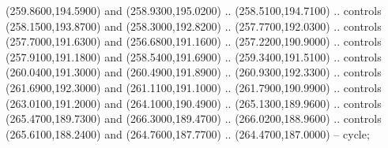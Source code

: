 {\begin{scope}[y=0.80pt, x=0.80pt, yscale=-1, xscale=1, inner sep=0pt, outer sep=0pt, #1]
      (259.8600,194.5900) and (258.9300,195.0200) .. (258.5100,194.7100) .. controls
      (258.1500,193.8700) and (258.3000,192.8200) .. (257.7700,192.0300) .. controls
      (257.7000,191.6300) and (256.6800,191.1600) .. (257.2200,190.9000) .. controls
      (257.9100,191.1800) and (258.5400,191.6900) .. (259.3400,191.5100) .. controls
      (260.0400,191.3000) and (260.4900,191.8900) .. (260.9300,192.3300) .. controls
      (261.6900,192.3000) and (261.1100,191.1000) .. (261.7900,190.9900) .. controls
      (263.0100,191.2000) and (264.1000,190.4900) .. (265.1300,189.9600) .. controls
      (265.4700,189.7300) and (266.3000,189.4700) .. (266.0200,188.9600) .. controls
      (265.6100,188.2400) and (264.7600,187.7700) .. (264.4700,187.0000) -- cycle;

  \end{scope}
}